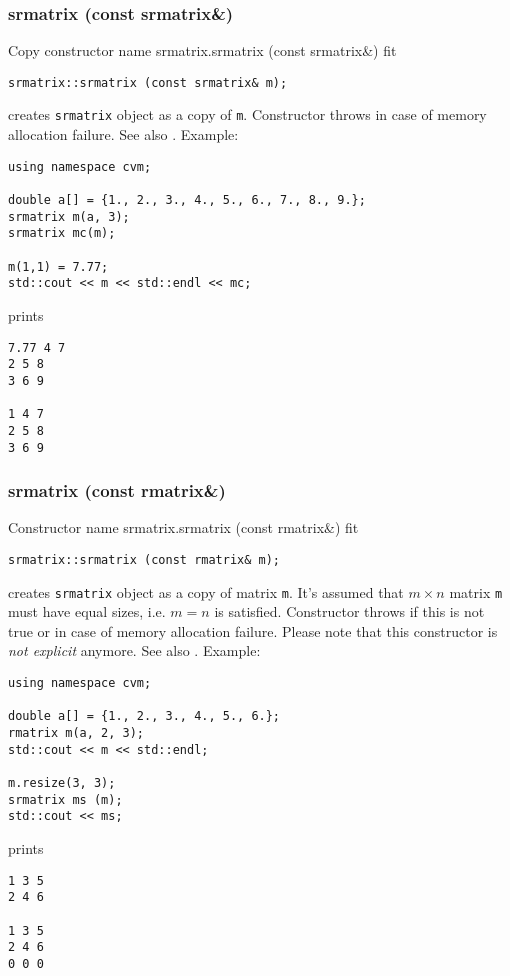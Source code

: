 \subsubsection{srmatrix (const srmatrix\&)}
Copy constructor%
\pdfdest name {srmatrix.srmatrix (const srmatrix&)} fit
\begin{verbatim}
srmatrix::srmatrix (const srmatrix& m);
\end{verbatim}
creates  \verb"srmatrix" object as a copy of \verb"m".
Constructor throws  
in case of memory allocation failure.
See also .
Example:
\begin{Verbatim}
using namespace cvm;

double a[] = {1., 2., 3., 4., 5., 6., 7., 8., 9.};
srmatrix m(a, 3);
srmatrix mc(m);

m(1,1) = 7.77;
std::cout << m << std::endl << mc;
\end{Verbatim}
prints
\begin{Verbatim}
7.77 4 7
2 5 8
3 6 9

1 4 7
2 5 8
3 6 9
\end{Verbatim}
\newpage



\subsubsection{srmatrix (const rmatrix\&)}
Constructor%
\pdfdest name {srmatrix.srmatrix (const rmatrix&)} fit
\begin{verbatim}
srmatrix::srmatrix (const rmatrix& m);
\end{verbatim}
creates  \verb"srmatrix" object as a copy of matrix \verb"m".
It's assumed that $m\times n$ matrix \verb"m" must have equal
sizes, i.e. $m = n$ is satisfied.
Constructor throws  
if this is not true or in case of memory allocation failure.
Please note that this constructor is \emph{not explicit} anymore.
See also .
Example:
\begin{Verbatim}
using namespace cvm;

double a[] = {1., 2., 3., 4., 5., 6.};
rmatrix m(a, 2, 3);
std::cout << m << std::endl;

m.resize(3, 3);
srmatrix ms (m);
std::cout << ms;
\end{Verbatim}
prints
\begin{Verbatim}
1 3 5
2 4 6

1 3 5
2 4 6
0 0 0
\end{Verbatim}
\newpage



